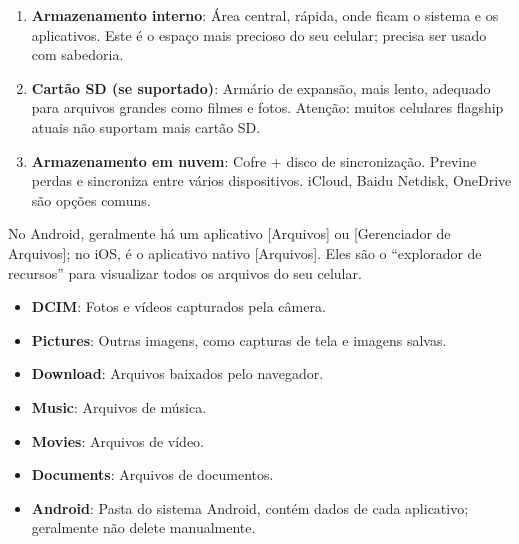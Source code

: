 


\begin{enumerate}
  \item \textbf{Armazenamento interno}: Área central, rápida, onde ficam o sistema e os aplicativos. Este é o espaço mais precioso do seu celular; precisa ser usado com sabedoria.
  \item \textbf{Cartão SD (se suportado)}: Armário de expansão, mais lento, adequado para arquivos grandes como filmes e fotos. Atenção: muitos celulares flagship atuais não suportam mais cartão SD.
  \item \textbf{Armazenamento em nuvem}: Cofre + disco de sincronização. Previne perdas e sincroniza entre vários dispositivos. iCloud, Baidu Netdisk, OneDrive são opções comuns.
\end{enumerate}


No Android, geralmente há um aplicativo [Arquivos] ou [Gerenciador de Arquivos]; no iOS, é o aplicativo nativo [Arquivos]. Eles são o “explorador de recursos” para visualizar todos os arquivos do seu celular.


\begin{itemize}
  \item \textbf{DCIM}: Fotos e vídeos capturados pela câmera.
  \item \textbf{Pictures}: Outras imagens, como capturas de tela e imagens salvas.
  \item \textbf{Download}: Arquivos baixados pelo navegador.
  \item \textbf{Music}: Arquivos de música.
  \item \textbf{Movies}: Arquivos de vídeo.
  \item \textbf{Documents}: Arquivos de documentos.
  \item \textbf{Android}: Pasta do sistema Android, contém dados de cada aplicativo; geralmente não delete manualmente.
\end{itemize}

